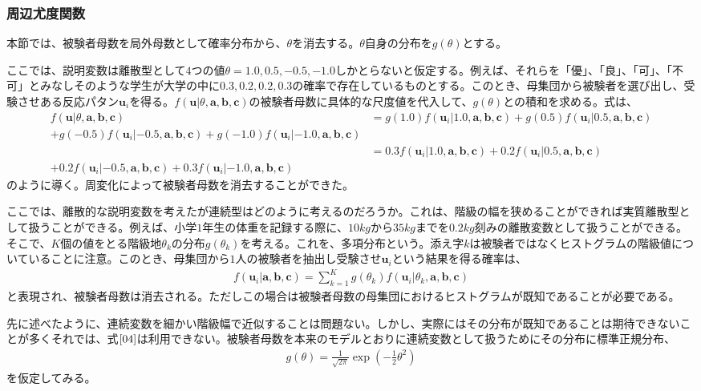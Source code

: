 \documentclass[12pt]{jarticle}
\begin{document}
\subsubsection{周辺尤度関数}
本節では、被験者母数を局外母数として確率分布から、$\displaystyle\theta$を消去する。$\displaystyle\theta$自身の分布を$\displaystyle g(\theta)$とする。

ここでは、説明変数は離散型として$4$つの値$\displaystyle \theta = 1.0,0.5,-0.5,-1.0$しかとらないと仮定する。例えば、それらを「優」、「良」、「可」、「不可」とみなしそのような学生が大学の中に$0.3,0.2,0.2,0.3$の確率で存在しているものとする。このとき、母集団から被験者を選び出し、受験させある反応パタン$\boldsymbol{u}_i$を得る。$f(\boldsymbol{u}|\theta,
\boldsymbol{a,b,c})$の被験者母数に具体的な尺度値を代入して、$g(\theta)$との積和を求める。式は、
\begin{align}
  \label{03}
  \displaystyle f(\boldsymbol{u}|\theta,\boldsymbol{a,b,c}) &= g(1.0)f(\boldsymbol{u}_i|1.0,\boldsymbol{a,b,c}) + g(0.5)f(\boldsymbol{u}_i|0.5,\boldsymbol{a,b,c})\\ + g(-0.5)f(\boldsymbol{u}_i|-0.5,\boldsymbol{a,b,c}) + g(-1.0)f(\boldsymbol{u}_i|-1.0,\boldsymbol{a,b,c})\\ &= 0.3f(\boldsymbol{u}_i|1.0,\boldsymbol{a,b,c}) + 0.2f(\boldsymbol{u}_i|0.5,\boldsymbol{a,b,c})\\ + 0.2f(\boldsymbol{u}_i|-0.5,\boldsymbol{a,b,c}) + 0.3f(\boldsymbol{u}_i|-1.0,\boldsymbol{a,b,c})
\end{align}
のように導く。周変化によって被験者母数を消去することができた。

ここでは、離散的な説明変数を考えたが連続型はどのように考えるのだろうか。これは、階級の幅を狭めることができれば実質離散型として扱うことができる。例えば、小学$1$年生の体重を記録する際に、$10kg$から$35kg$までを$0.2kg$刻みの離散変数として扱うことができる。そこで、$K$個の値をとる階級地$\displaystyle \theta_k$の分布$\displaystyle g(\theta_k)$を考える。これを、多項分布という。添え字$k$は被験者ではなくヒストグラムの階級値についていることに注意。このとき、母集団から$1$人の被験者を抽出し受験させ$\displaystyle \boldsymbol{u}_i$という結果を得る確率は、
\begin{align}
  \label{04}
  \displaystyle  f(\boldsymbol{u}_i|\boldsymbol{a,b,c}) = \sum_{k = 1}^{K} g(\theta_k)f(\boldsymbol{u}_i|\theta_k,\boldsymbol{a,b,c}) \tag{4.20}
\end{align}
と表現され、被験者母数は消去される。ただしこの場合は被験者母数の母集団におけるヒストグラムが既知であることが必要である。

先に述べたように、連続変数を細かい階級幅で近似することは問題ない。しかし、実際にはその分布が既知であることは期待できないことが多くそれでは、式$\ref{04}$は利用できない。被験者母数を本来のモデルとおりに連続変数として扱うためにその分布に標準正規分布、
\begin{align}
  \label{05}
  \displaystyle g(\theta) = \frac{1}{\sqrt{2\pi}}\exp(-\frac{1}{2}\theta^2)   \tag{4.21}
\end{align}
を仮定してみる。
\end{document}
